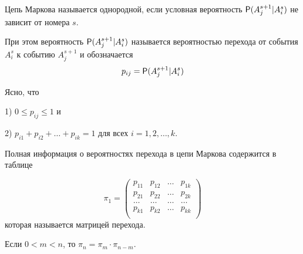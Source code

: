 \begin{definition}
\label{def:28.2}
Цепь Маркова называется однородной, если условная вероятность $\P(A^{s+1}_j|A^s_i)$ не зависит от номера $s$.

При этом вероятность $\P(A^{s+1}_j|A^s_i)$ называется вероятностью перехода от события $A^s_i$ к событию $A^{s+1}_j$ и обозначается
$$p_{ij} = \P(A^{s+1}_j|A^s_i)$$
\end{definition}

\begin{zam}
\label{zam:28.3}
Ясно, что

1) $0 \leq p_{ij} \leq 1$ и

2) $p_{i1} + p_{i2} + \ldots + p_{ik} = 1$ для всех $i = 1, 2, \ldots , k.$
\end{zam}

\begin{definition}
\label{def:28.4}
Полная информация о вероятностях перехода в цепи Маркова содержится в таблице

$$\pi_1 = \begin{pmatrix} 
p_{11} & p_{12} & \ldots & p_{1k}\\
p_{21} & p_{22} & \ldots & p_{2k}\\
\ldots & \ldots & \ldots & \ldots\\
p_{k1} & p_{k2} & \ldots & p_{kk}\\
\end{pmatrix}
$$
которая называется матрицей перехода.
\end{definition}


\begin{theorem}
\label{th:28.6}
	Если $0 < m < n$, то $\pi_n = \pi_m \cdot \pi_{n−m} .$
\end{theorem}

